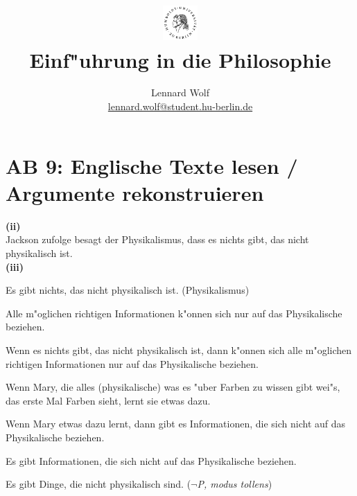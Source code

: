 \documentclass[a4paper]{article}
\date{\vspace{-3ex}}
\begin{document}
\title{
    \vspace{-30pt}
	\includegraphics*[width=0.1\textwidth,left]{images/hu_logo2.png}\\
	\vspace{-10pt}
	Einf"uhrung in die Philosophie}
\author{Lennard Wolf\\
        \small{\href{mailto:lennard.wolf@student.hu-berlin.de}{lennard.wolf@student.hu-berlin.de}}}
\maketitle
\vspace{0pt}

\section*{AB 9: Englische Texte lesen / Argumente rekonstruieren}
\large

\noindent\textbf{(ii)}\\
\noindent Jackson zufolge besagt der Physikalismus, dass es nichts gibt, das nicht physikalisch ist.\\

\noindent\textbf{(iii)}\\
\begin{description}[leftmargin=!,labelwidth=\widthof{\bfseries M $\rightarrow \neg$P1}]
  \item[P] Es gibt nichts, das nicht physikalisch ist. (Physikalismus)
  \item[P1] Alle m"oglichen richtigen Informationen k"onnen sich nur auf das Physikalische beziehen. 
  \item[P $\rightarrow$ P1] Wenn es nichts gibt, das nicht physikalisch ist, dann k"onnen sich alle m"oglichen richtigen Informationen nur auf das Physikalische beziehen.
  \item[M] Wenn Mary, die alles (physikalische) was es "uber Farben zu wissen gibt wei"s, das erste Mal Farben sieht, lernt sie etwas dazu.
  \item[M $\rightarrow \neg$P1] Wenn Mary etwas dazu lernt, dann gibt es Informationen, die sich nicht auf das Physikalische beziehen.
  \item[$\neg$P1] Es gibt Informationen, die sich nicht auf das Physikalische beziehen. 
  \item[K] Es gibt Dinge, die nicht physikalisch sind. (\emph{$\neg$P, modus tollens})
\end{description}
\end{document}
